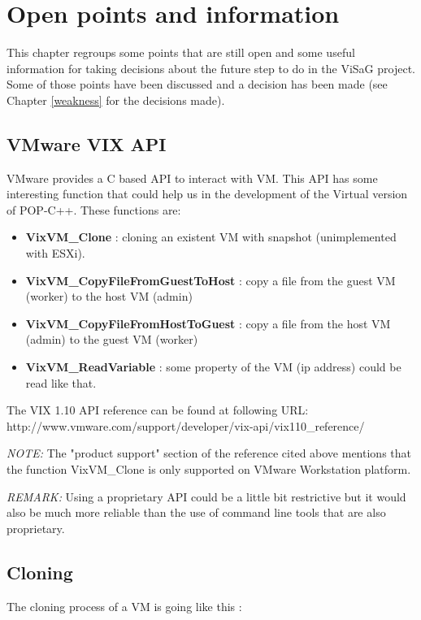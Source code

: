 \section{Open points and information}
\label{hints}

This chapter regroups some points that are still open and some useful information for taking decisions about the future step to do in the ViSaG project. Some of those points have been discussed and a decision has been made (see Chapter \ref{weakness} for the decisions made). 

\subsection{VMware VIX API}
VMware provides a C based API to interact with VM. This API has some interesting function that could help us in the development of the Virtual version of POP-C++. These functions are: 

\begin{itemize}
\item \textbf{VixVM\_Clone} : cloning an existent VM with snapshot (unimplemented with ESXi).
\item \textbf{VixVM\_CopyFileFromGuestToHost} : copy a file from the guest VM (worker) to the host VM (admin)
\item \textbf{VixVM\_CopyFileFromHostToGuest} : copy a file from the host VM (admin) to the guest VM (worker)
\item \textbf{VixVM\_ReadVariable} : some property of the VM (ip address) could be read like that.
\end{itemize}

The VIX 1.10 API reference can be found at following URL: \\
http://www.vmware.com/support/developer/vix-api/vix110\_reference/\s

\textit{NOTE:} The "product support" section of the reference cited above mentions that the function VixVM\_Clone is only supported on VMware Workstation platform.\s

\textit{REMARK:} Using a proprietary API could be a little bit restrictive but it would also be much more reliable than the use of command line tools that are also proprietary.

\subsection{Cloning}
The cloning process of a VM is going like this : 

